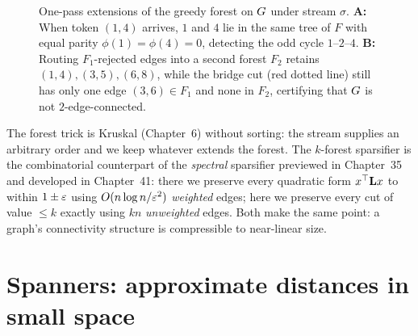 \begin{figure}[htbp]
\caption{One-pass extensions of the greedy forest on $G$ under stream $\sigma$. \textbf{A:} When token $(1,4)$ arrives, $1$ and $4$ lie in the same tree of $F$ with equal parity $\phi(1)=\phi(4)=0$, detecting the odd cycle $1$--$2$--$4$. \textbf{B:} Routing $F_1$-rejected edges into a second forest $F_2$ retains $(1,4),(3,5),(6,8)$, while the bridge cut (red dotted line) still has only one edge $(3,6)\in F_1$ and none in $F_2$, certifying that $G$ is not $2$-edge-connected.}
\label{ch40:fig-bipartite-kforest}
\end{figure}

\begin{connectionbox}
The forest trick is Kruskal (Chapter~6) without sorting: the stream supplies
an arbitrary order and we keep whatever extends the forest. The $k$-forest
sparsifier is the combinatorial counterpart of the \emph{spectral} sparsifier previewed in
Chapter~35 and developed in Chapter~41: there we preserve every quadratic form $x^\top\mathbf{L} x$ to
within $1\pm\varepsilon$ using $O(n\log n/\varepsilon^2)$ \emph{weighted} edges; here we
preserve every cut of value $\le k$ exactly using $kn$ \emph{unweighted}
edges. Both make the same point: a graph's connectivity structure is
compressible to near-linear size.
\end{connectionbox}

\section{Spanners: approximate distances in small space}
\label{ch40:spanners}

